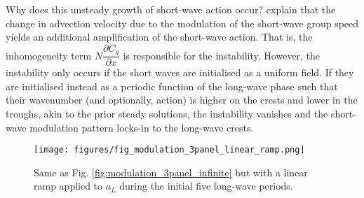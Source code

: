 \documentclass[lineno]{jfm}
\begin{document}
Why does this unsteady growth of short-wave action occur?
\citet{peureux2021unsteady} explain that the change in advection velocity due to
the modulation of the short-wave group speed yields an additional amplification
of the short-wave action.
That is, the inhomogeneity term $N \dfrac{\partial C_g}{\partial x}$ is
responsible for the instability.
However, the instability only occurs if the short waves are initialised as a
uniform field.
If they are initialised instead as a periodic function of the long-wave phase
such that their wavenumber (and optionally, action) is higher on the crests
and lower in the troughs, akin to the prior steady solutions, the instability
vanishes and the short-wave modulation pattern locks-in to the long-wave
crests.

\begin{figure}
\centering
\texttt{[image: figures/fig\_modulation\_3panel\_linear\_ramp.png]}
\caption{
  Same as Fig. \ref{fig:modulation_3panel_infinite} but with a linear ramp
  applied to $a_L$ during the initial five long-wave periods.
}
\label{fig:modulation_3panel_ramp}
\end{figure}
\end{document}
